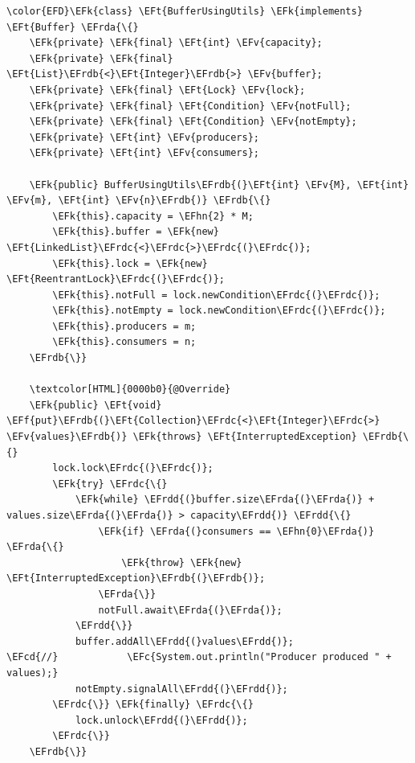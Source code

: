 \documentclass[11pt]{article}
\newcommand{\EFc}[1]{\textcolor{EFc}{\textit{#1}}} %
\newcommand{\EFcd}[1]{\textcolor{EFcd}{\textit{#1}}} %
\newcommand{\EFk}[1]{\textcolor{EFk}{#1}} %
\newcommand{\EFf}[1]{\textcolor{EFf}{#1}} %
\newcommand{\EFv}[1]{\textcolor{EFv}{#1}} %
\newcommand{\EFt}[1]{\textcolor{EFt}{#1}} %
\newcommand{\EFhn}[1]{\textcolor{EFhn}{#1}} %
\newcommand{\EFrda}[1]{#1} %
\newcommand{\EFrdb}[1]{\textcolor{EFrdb}{#1}} %
\newcommand{\EFrdc}[1]{\textcolor{EFrdc}{#1}} %
\newcommand{\EFrdd}[1]{\textcolor{EFrdd}{#1}} %
\begin{document}
\begin{Code}
\begin{Verbatim}
\color{EFD}\EFk{class} \EFt{BufferUsingUtils} \EFk{implements} \EFt{Buffer} \EFrda{\{}
    \EFk{private} \EFk{final} \EFt{int} \EFv{capacity};
    \EFk{private} \EFk{final} \EFt{List}\EFrdb{<}\EFt{Integer}\EFrdb{>} \EFv{buffer};
    \EFk{private} \EFk{final} \EFt{Lock} \EFv{lock};
    \EFk{private} \EFk{final} \EFt{Condition} \EFv{notFull};
    \EFk{private} \EFk{final} \EFt{Condition} \EFv{notEmpty};
    \EFk{private} \EFt{int} \EFv{producers};
    \EFk{private} \EFt{int} \EFv{consumers};

    \EFk{public} BufferUsingUtils\EFrdb{(}\EFt{int} \EFv{M}, \EFt{int} \EFv{m}, \EFt{int} \EFv{n}\EFrdb{)} \EFrdb{\{}
        \EFk{this}.capacity = \EFhn{2} * M;
        \EFk{this}.buffer = \EFk{new} \EFt{LinkedList}\EFrdc{<}\EFrdc{>}\EFrdc{(}\EFrdc{)};
        \EFk{this}.lock = \EFk{new} \EFt{ReentrantLock}\EFrdc{(}\EFrdc{)};
        \EFk{this}.notFull = lock.newCondition\EFrdc{(}\EFrdc{)};
        \EFk{this}.notEmpty = lock.newCondition\EFrdc{(}\EFrdc{)};
        \EFk{this}.producers = m;
        \EFk{this}.consumers = n;
    \EFrdb{\}}

    \textcolor[HTML]{0000b0}{@Override}
    \EFk{public} \EFt{void} \EFf{put}\EFrdb{(}\EFt{Collection}\EFrdc{<}\EFt{Integer}\EFrdc{>} \EFv{values}\EFrdb{)} \EFk{throws} \EFt{InterruptedException} \EFrdb{\{}
        lock.lock\EFrdc{(}\EFrdc{)};
        \EFk{try} \EFrdc{\{}
            \EFk{while} \EFrdd{(}buffer.size\EFrda{(}\EFrda{)} + values.size\EFrda{(}\EFrda{)} > capacity\EFrdd{)} \EFrdd{\{}
                \EFk{if} \EFrda{(}consumers == \EFhn{0}\EFrda{)} \EFrda{\{}
                    \EFk{throw} \EFk{new} \EFt{InterruptedException}\EFrdb{(}\EFrdb{)};
                \EFrda{\}}
                notFull.await\EFrda{(}\EFrda{)};
            \EFrdd{\}}
            buffer.addAll\EFrdd{(}values\EFrdd{)};
\EFcd{//}            \EFc{System.out.println("Producer produced " + values);}
            notEmpty.signalAll\EFrdd{(}\EFrdd{)};
        \EFrdc{\}} \EFk{finally} \EFrdc{\{}
            lock.unlock\EFrdd{(}\EFrdd{)};
        \EFrdc{\}}
    \EFrdb{\}}


\end{Verbatim}
\end{Code}
\end{document}
